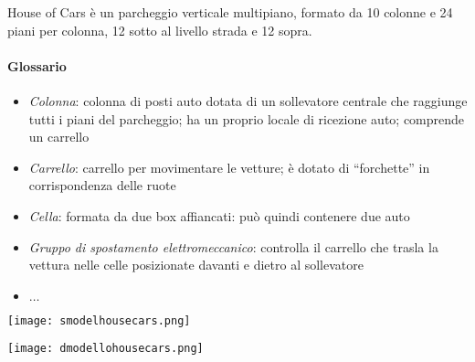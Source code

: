 \begin{example}
	House of Cars è un parcheggio verticale multipiano, formato da 10 colonne e 24 piani per colonna, 12 sotto al livello strada e 12 sopra.
	
	\paragraph{Glossario}
	\begin{itemize}
		\item \textit{Colonna}: colonna di posti auto dotata di un sollevatore centrale che raggiunge tutti i piani del parcheggio; ha un proprio locale di ricezione auto; comprende un carrello
		\item \textit{Carrello}: carrello per movimentare le vetture; è dotato di “forchette” in corrispondenza delle ruote
		\item \textit{Cella}: formata da due box affiancati: può quindi contenere due auto
		\item \textit{Gruppo di spostamento elettromeccanico}: controlla il carrello che trasla la vettura nelle celle posizionate davanti e dietro al sollevatore
		\item  $\ldots$
	\end{itemize}
	
	\begin{center}
		\texttt{[image: smodelhousecars.png]}
	\end{center}
	\begin{center}
		\texttt{[image: dmodellohousecars.png]}
	\end{center}
\end{example}

